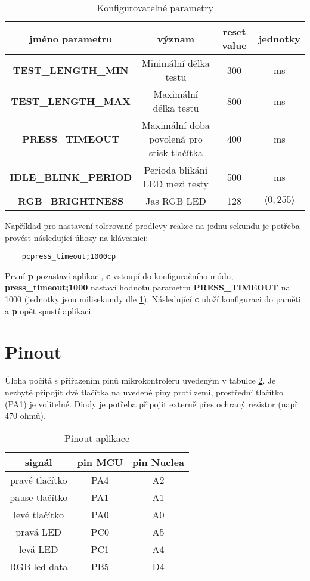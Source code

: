 \documentclass[twoside]{article}
\begin{document}
\begin{table}[htbp]
    \centering
    \begin{tabular}{c|c|c|c}
        jméno parametru & význam & reset value & jednotky \\ \hline
        \textbf{TEST\_LENGTH\_MIN} & Minimální délka testu & 300 & ms\\
        \textbf{TEST\_LENGTH\_MAX} & Maximální délka testu & 800 & ms\\
        \textbf{PRESS\_TIMEOUT} & Maximální doba povolená pro stisk tlačítka & 400 & ms \\
        \textbf{IDLE\_BLINK\_PERIOD} & Perioda blikání LED mezi testy & 500 & ms \\
        \textbf{RGB\_BRIGHTNESS} & Jas RGB LED & 128 & $\langle 0, 255\rangle$
    \end{tabular}
    \caption{Konfigurovatelné parametry}
    \label{table:config}
\end{table}

Například pro nastavení tolerované prodlevy reakce na jednu sekundu je potřeba provést následující úhozy na klávesnici:
\begin{lstlisting}
    pcpress_timeout;1000cp
\end{lstlisting}
První \textbf{p} pozastaví aplikaci, \textbf{c} vstoupí do konfiguračního módu, \textbf{press\_timeout;1000} nastaví hodnotu parametru \textbf{PRESS\_TIMEOUT}
na 1000 (jednotky jsou milisekundy dle \ref{table:config}). Následující \textbf{c} uloží konfiguraci do paměti a \textbf{p} opět spustí aplikaci.

\section{Pinout}

Úloha počítá s přiřazením pinů mikrokontroleru uvedeným v tabulce \ref{table:pinout}. Je nezbyté připojit dvě tlačítka na uvedené piny proti zemi,
prostřední tlačítko (PA1) je volitelné.
Diody je potřeba připojit externě přes ochraný rezistor (např 470 ohmů).

\begin{table}[htbp]
    \centering
    \begin{tabular}{c|c|c}
        signál & pin MCU & pin Nuclea \\ \hline
        pravé tlačítko & PA4 & A2 \\
        pause tlačítko & PA1 & A1 \\
        levé tlačítko & PA0 & A0 \\
        pravá LED & PC0 & A5 \\
        levá LED & PC1 & A4 \\
        RGB led data & PB5 & D4
    \end{tabular}
    \caption{Pinout aplikace}
    \label{table:pinout}
\end{table}
\end{document}
